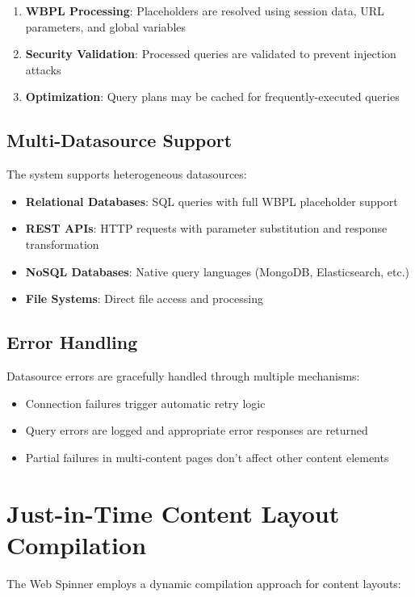 \begin{enumerate}
\item \textbf{WBPL Processing}: Placeholders are resolved using session data, URL parameters, and global variables
\item \textbf{Security Validation}: Processed queries are validated to prevent injection attacks
\item \textbf{Optimization}: Query plans may be cached for frequently-executed queries
\end{enumerate}

\subsection{Multi-Datasource Support}
The system supports heterogeneous datasources:

\begin{itemize}
\item \textbf{Relational Databases}: SQL queries with full WBPL placeholder support
\item \textbf{REST APIs}: HTTP requests with parameter substitution and response transformation
\item \textbf{NoSQL Databases}: Native query languages (MongoDB, Elasticsearch, etc.)
\item \textbf{File Systems}: Direct file access and processing
\end{itemize}

\subsection{Error Handling}
Datasource errors are gracefully handled through multiple mechanisms:
\begin{itemize}
\item Connection failures trigger automatic retry logic
\item Query errors are logged and appropriate error responses are returned
\item Partial failures in multi-content pages don't affect other content elements
\end{itemize}

\section{Just-in-Time Content Layout Compilation}

The Web Spinner employs a dynamic compilation approach for content layouts:

